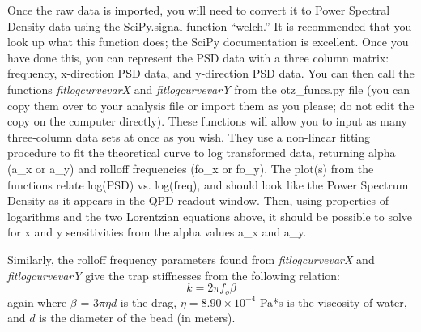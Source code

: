 \documentclass{../lab}
\begin{document}





Once the raw data is imported, you will need to convert it to Power Spectral Density data using the SciPy.signal function ``welch.'' It is recommended that you look up what this function does; the SciPy documentation is excellent. Once you have done this, you can represent the PSD data with a three column matrix: frequency, x-direction PSD data, and y-direction PSD data. You can then call the functions \emph{fitlogcurvevarX} and \emph{fitlogcurvevarY} from the otz\_funcs.py file (you can copy them over to your analysis file or import them as you please; do not edit the copy on the computer directly). These functions will allow you to input as many three-column data sets at once as you wish. They use a non-linear fitting procedure to fit the theoretical curve to log transformed data, returning alpha (a\_x or a\_y) and rolloff frequencies (fo\_x or fo\_y). The plot(s) from the functions relate log(PSD) vs. log(freq), and should look like the Power Spectrum Density as it appears in the QPD readout window.
Then, using properties of logarithms and the two Lorentzian equations above, it should be possible to solve for x and y sensitivities from the alpha values a\_x and a\_y.

Similarly, the rolloff frequency parameters found from \emph{fitlogcurvevarX} and \emph{fitlogcurvevarY} give the trap stiffnesses from the following relation:
\[
    k = 2 \pi f_o \beta
\]
again where $\beta$ = $3\pi\eta d$  is the drag, $\eta = 8.90 \times 10^{-4}$ Pa*s is the viscosity of water, and $d$ is the diameter of the bead (in meters).
\end{document}
